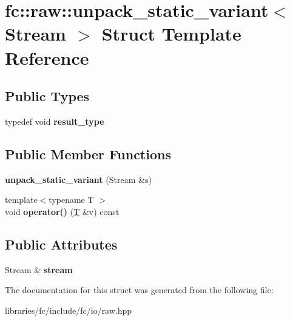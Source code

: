 \hypertarget{structfc_1_1raw_1_1unpack__static__variant}{}\section{fc\+:\+:raw\+:\+:unpack\+\_\+static\+\_\+variant$<$ Stream $>$ Struct Template Reference}
\label{structfc_1_1raw_1_1unpack__static__variant}
\subsection*{Public Types}
\begin{DoxyCompactItemize}
\item 
\mbox{\label{structfc_1_1raw_1_1unpack__static__variant_a16b708cb0a3955f157c8926c28b029f8}} 
typedef void {\bfseries result\+\_\+type}
\end{DoxyCompactItemize}
\subsection*{Public Member Functions}
\begin{DoxyCompactItemize}
\item 
\mbox{\label{structfc_1_1raw_1_1unpack__static__variant_a3acc8bd43a8e1717f440ad7b7bf67e80}} 
{\bfseries unpack\+\_\+static\+\_\+variant} (Stream \&s)
\item 
\mbox{\label{structfc_1_1raw_1_1unpack__static__variant_ae32fe99a9e9fb691b325a7f517fc8ca9}} 
{\footnotesize template$<$typename T $>$ }\\void {\bfseries operator()} (\mbox{\hyperlink{struct_t}{T}} \&v) const
\end{DoxyCompactItemize}
\subsection*{Public Attributes}
\begin{DoxyCompactItemize}
\item 
\mbox{\label{structfc_1_1raw_1_1unpack__static__variant_a59df3b65e251bb7d4913d68d76170886}} 
Stream \& {\bfseries stream}
\end{DoxyCompactItemize}


The documentation for this struct was generated from the following file\+:\begin{DoxyCompactItemize}
\item 
libraries/fc/include/fc/io/raw.\+hpp\end{DoxyCompactItemize}
